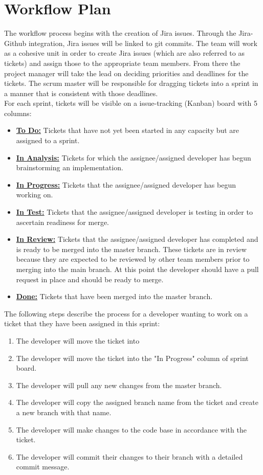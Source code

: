 \documentclass{article}
\begin{document}
\section{Workflow Plan}

The workflow process begins with the creation of Jira issues. Through the Jira-Github integration, Jira issues will be linked to git commits.
The team will work as a cohesive unit in order to create Jira issues (which are also referred to as tickets) and assign those to the appropriate team members. 
From there the project manager will take the lead on deciding priorities and deadlines for the tickets. 
The scrum master will be responsible for dragging tickets into a sprint in a manner that is consistent with those deadlines.\\

For each sprint, tickets will be visible on a issue-tracking (Kanban) board with 5 columns:

\begin{itemize}
	\item \textbf{\underline{To Do:}} Tickets that have not yet been started in any capacity but are assigned to a sprint.
	\item \textbf{\underline{In Analysis:}} Tickets for which the assignee/assigned developer has begun brainstorming an implementation. 
	\item \textbf{\underline{In Progress:}} Tickets that the assignee/assigned developer has begun working on.
	\item \textbf{\underline{In Test:}} Tickets that the assignee/assigned developer is testing in order to ascertain readiness for merge.
	\item \textbf{\underline{In Review:}} Tickets that the assignee/assigned developer has completed and is ready to be merged into the master branch.
	These tickets are in review because they are expected to be reviewed by other team members prior to merging into the main branch. 
	At this point the developer should have a pull request in place and should be ready to merge.
	\item \textbf{\underline{Done:}} Tickets that have been merged into the master branch. 
\end{itemize} 


The following steps describe the process for a developer wanting to work on a ticket that they have been assigned in this sprint:
\begin{enumerate}
	\item The developer will move the ticket into
	\item The developer will move the ticket into the "In Progress" column of sprint board.
	\item The developer will pull any new changes from the master branch. 
	\item The developer will copy the assigned branch name from the ticket and create a new branch with that name.
	\item The developer will make changes to the code base in accordance with the ticket.
	\item The developer will commit their changes to their branch with a detailed commit message. 
\end{enumerate}
\end{document}
